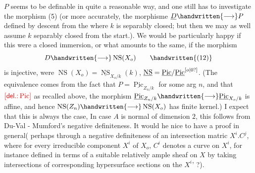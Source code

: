  $P$ seems to be definable in quite a reasonable way, and one still has to investigate the morphism (5) (or more accurately, the morphisme $\underline{D}\handwritten{\longrightarrow}P$ defined by descent from the  where $k$ is separably closed; but then we may as well assume $k$ separably closed from the start\handwritten{,}.). We would be particularly happy if this were a closed immersion, or what amounts to the same, if the morphism
\[
D\handwritten{\longrightarrow}\operatorname{NS}(X_o)
\tag*{\handwritten{(12)}}
\]
is injective, were $\operatorname{NS}(X_o)=\underline{\operatorname{NS}}_{X_o/k}(k)$, $\underline{\operatorname{NS}}=\underline{\operatorname{Pic}}/\underline{\operatorname{Pic}}^{[o|0?]}$. (The equivalence comes from the fact that $P=\underline{\operatorname{Pic}}_{Z_n/k}$ for some arg $n$, and that $\textcolor{red}{[\textsf{del.:} \operatorname{Pic}]}$
as recalled above, the morphism $\underline{\operatorname{Pic}}_{Z_n/k}\handwritten{\longrightarrow}\underline{\operatorname{Pic}}_{X_o/k}$ is affine, and hence $\operatorname{NS}(Z_n)\handwritten{\longrightarrow}\operatorname{NS}(X_o)$ has finite kernel.) I expect that this is always the case,  In case $A$ is normal of dimension $2$, this follows from Du-Val - Mumford's negative definiteness. It would he nice to have a proof in general( perhaps through a negative definiteness of an intersection matric $X^i.C^j$, where for every irreducible component $X^i$ of $X_o$, $C^i$ denotes a  curve on $X^i$, for instance defined in terms of a suitable  relatively ample sheaf on $X$ by taking intersections of corresponding hypersurface sections on the $X^i$' ?).

